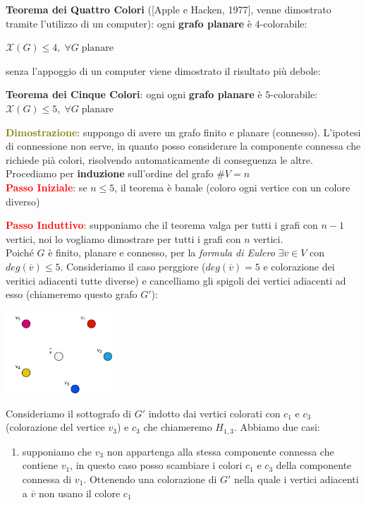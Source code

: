 \begin{flushleft}
    \textbf{Teorema dei Quattro Colori} ([Apple e Hacken, 1977], venne dimostrato tramite l'utilizzo di un computer): ogni \textbf{grafo planare} è $4$-colorabile:

    {\centering
        $\mathcal{X}(G) \leq 4, \; \forall G \; \text{planare}$
    \par}
    senza l'appoggio di un computer viene dimostrato il risultato più debole:

    \textbf{Teorema dei Cinque Colori}: ogni ogni \textbf{grafo planare} è $5$-colorabile: $\mathcal{X}(G) \leq 5, \; \forall G \; \text{planare}$

    \begin{boxA}
        \textcolor{olive}{\textbf{Dimostrazione}}: suppongo di avere un grafo finito e planare (connesso). L'ipotesi di connessione non serve, in quanto posso considerare la componente connessa che richiede pià colori, risolvendo automaticamente di conseguenza le altre. \\
        Procediamo per \textbf{induzione} sull'ordine del grafo $\# V = n$ \\
        \textcolor{red}{\textbf{Passo Iniziale}}: se $n \leq 5$, il teorema è banale (coloro ogni vertice con un colore diverso)
    \end{boxA}
    \begin{boxA}
        \textcolor{red}{\textbf{Passo Induttivo}}: supponiamo che il teorema valga per tutti i grafi con $n-1$ vertici, noi lo vogliamo dimostrare per tutti i grafi con $n$ vertici. \\
        Poiché $G$ è finito, planare e connesso, per la \textit{formula di Eulero} $\exists \overline{v} \in V$ con $deg(\overline{v}) \leq 5$. Consideriamo il caso perggiore ($deg(\overline{v}) = 5$ e colorazione dei veritici adiacenti tutte diverse) e cancelliamo gli spigoli dei vertici adiacenti ad esso (chiameremo questo grafo $G'$):

        \begin{center}
            \includegraphics[width=0.3\textwidth]{img/5colori}
        \end{center}
        Consideriamo il sottografo di $G'$ indotto dai vertici colorati con $c_1$ e $c_3$ (colorazione del vertice $v_3$) e $c_3$ che chiameremo $H_{1, 3}$. Abbiamo due casi:
        \begin{enumerate}[nosep]
            \item supponiamo che $v_3$ non appartenga alla stessa componente connessa che contiene $v_1$, in questo caso posso scambiare i colori $c_1$ e $c_3$ della componente connessa di $v_1$. Ottenendo una colorazione di $G'$ nella quale i vertici adiacenti a $\overline{v}$ non usano il colore $c_1$
            

\end{enumerate}
\end{boxA}
\end{flushleft}
